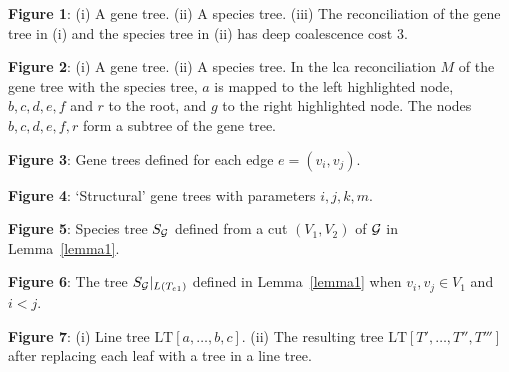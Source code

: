 \documentclass[9.5pt,journal,letterpaper,compsoc]{IEEEtran}
\begin{document}
{\bf Figure 1}: (i) A gene tree. (ii) A species tree. (iii) The reconciliation of  the gene tree in (i) and
 the species tree in (ii) has deep coalescence cost 3.
\vspace{1em}

\noindent
{\bf Figure 2}:  (i) A gene tree. (ii) A species tree. In the lca  reconciliation $M$
  of the gene tree with the species tree,   $a$ is mapped to the left highlighted node,
$b, c, d, e, f$ and $r$ to the root, and $g$ to the right highlighted node.
The nodes $b, c, d, e, f, r$ form a subtree of the gene tree.
\vspace{1em}

\noindent 
{\bf Figure 3}:  Gene trees defined for each edge $e=(v_i, v_j)$.
\vspace{1em}

\noindent 
{\bf Figure 4}: `Structural' gene trees with parameters $i, j, k, m$.
\vspace{1em}



\noindent 
{\bf Figure 5}: Species tree $S_{\cal G}$ defined from a cut $(V_1, V_2)$ of $\cal G$ in Lemma~\ref{lemma1}.
\vspace{1em}

\noindent 
{\bf Figure 6}: The tree $S_{\cal G}|_{L(T_{e1})}$ defined in Lemma~\ref{lemma1} when $v_i, v_j\in V_1$ and $i<j$.
\vspace{1em}

\noindent 
{\bf Figure 7}: (i) Line tree $\mbox{LT}[a, \ldots, b, c]$. (ii) The resulting tree $\mbox{LT}[T', \ldots, T'', T''']$
 after replacing each leaf with a tree in a line tree.
\end{document}
